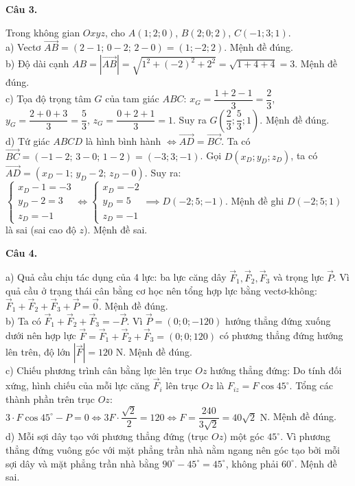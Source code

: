 \documentclass[12pt,a4paper]{article}
\newcommand{\loigiai}[1]{\par\medskip\Needspace{4\baselineskip}\noindent\textbf{#1}\par\nobreak}
\begin{document}
\loigiai{Câu 3.}
Trong không gian $Oxyz$, cho $A(1;2;0)$, $B(2;0;2)$, $C(-1;3;1)$.\\
a) Vectơ $\vec{AB}=(2-1;\,0-2;\,2-0)=(1;-2;2)$. Mệnh đề đúng.\\
b) Độ dài cạnh $AB=|\vec{AB}|=\sqrt{1^2+(-2)^2+2^2}=\sqrt{1+4+4}=3$. Mệnh đề đúng.\\
c) Tọa độ trọng tâm $G$ của tam giác $ABC$:
$x_G=\dfrac{1+2-1}{3}=\dfrac{2}{3}$, $y_G=\dfrac{2+0+3}{3}=\dfrac{5}{3}$, $z_G=\dfrac{0+2+1}{3}=1$.
Suy ra $G\left(\dfrac{2}{3};\dfrac{5}{3};1\right)$. Mệnh đề đúng.\\
d) Tứ giác $ABCD$ là hình bình hành $\iff \vec{AD}=\vec{BC}$.
Ta có $\vec{BC}=(-1-2;\,3-0;\,1-2)=(-3;3;-1)$.
Gọi $D(x_D;y_D;z_D)$, ta có $\vec{AD}=(x_D-1;\,y_D-2;\,z_D-0)$.
Suy ra:
$\begin{cases}x_D-1=-3\\y_D-2=3\\z_D=-1\end{cases}\iff\begin{cases}x_D=-2\\y_D=5\\z_D=-1\end{cases}\implies D(-2;5;-1)$.
Mệnh đề ghi $D(-2;5;1)$ là sai (sai cao độ $z$). Mệnh đề sai.

\loigiai{Câu 4.}
a) Quả cầu chịu tác dụng của 4 lực: ba lực căng dây $\vec{F}_1, \vec{F}_2, \vec{F}_3$ và trọng lực $\vec{P}$. Vì quả cầu ở trạng thái cân bằng cơ học nên tổng hợp lực bằng vectơ-không: $\vec{F}_1+\vec{F}_2+\vec{F}_3+\vec{P}=\vec{0}$. Mệnh đề đúng.\\
b) Ta có $\vec{F}_1+\vec{F}_2+\vec{F}_3 = -\vec{P}$.
Vì $\vec{P}=(0;0;-120)$ hướng thẳng đứng xuống dưới nên hợp lực $\vec{F}=\vec{F}_1+\vec{F}_2+\vec{F}_3=(0;0;120)$ có phương thẳng đứng hướng lên trên, độ lớn $|\vec{F}|=120\text{ N}$. Mệnh đề đúng.\\
c) Chiếu phương trình cân bằng lực lên trục $Oz$ hướng thẳng đứng:
Do tính đối xứng, hình chiếu của mỗi lực căng $\vec{F}_i$ lên trục $Oz$ là $F_{iz} = F\cos 45^\circ$.
Tổng các thành phần trên trục $Oz$:
$3\cdot F\cos 45^\circ - P = 0 \iff 3F\cdot\dfrac{\sqrt{2}}{2} = 120 \iff F = \dfrac{240}{3\sqrt{2}} = 40\sqrt{2}\text{ N}$. Mệnh đề đúng.\\
d) Mỗi sợi dây tạo với phương thẳng đứng (trục $Oz$) một góc $45^\circ$. Vì phương thẳng đứng vuông góc với mặt phẳng trần nhà nằm ngang nên góc tạo bởi mỗi sợi dây và mặt phẳng trần nhà bằng $90^\circ - 45^\circ = 45^\circ$, không phải $60^\circ$. Mệnh đề sai.
\end{document}
